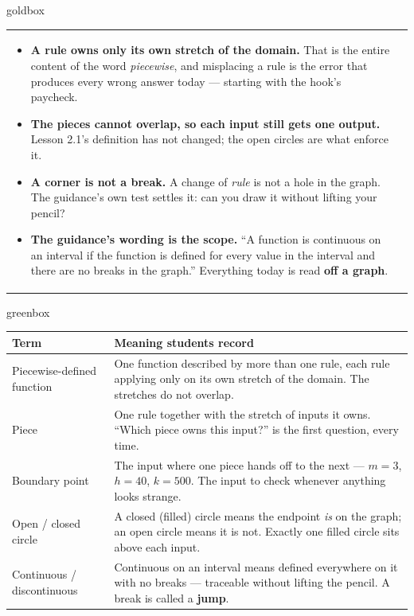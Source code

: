 \documentclass[10pt]{article}
\begin{document}
\begin{skillbox}{goldbox}
\begin{tabularx}{\linewidth}{@{}X|X@{}}
\begin{minipage}[t]{\linewidth}
\begin{itemize}[leftmargin=1.1em, itemsep=2pt, topsep=2pt]
  \item \textbf{A rule owns only its own stretch of the domain.} That is the entire content of the
        word \emph{piecewise}, and misplacing a rule is the error that produces every wrong answer
        today --- starting with the hook's paycheck.
  \item \textbf{The pieces cannot overlap, so each input still gets one output.} Lesson 2.1's
        definition has not changed; the open circles are what enforce it.
  \item \textbf{A corner is not a break.} A change of \emph{rule} is not a hole in the graph. The
        guidance's own test settles it: can you draw it without lifting your pencil?
  \item \textbf{The guidance's wording is the scope.} ``A function is continuous on an interval if
        the function is defined for every value in the interval and there are no breaks in the
        graph.'' Everything today is read \textbf{off a graph}.
\end{itemize}
\end{minipage}
\end{tabularx}
\end{skillbox}

\begin{skillbox}{greenbox}
\renewcommand{\arraystretch}{1.35}
\begin{tabularx}{\linewidth}{@{}p{4.1cm}X@{}}
\textbf{Term} & \textbf{Meaning students record} \\
\hline
Piecewise-defined function & One function described by more than one rule, each rule applying only on
    its own stretch of the domain. The stretches do not overlap. \\
Piece & One rule together with the stretch of inputs it owns. ``Which piece owns this input?'' is the
    first question, every time. \\
Boundary point & The input where one piece hands off to the next --- $m=3$, $h=40$, $k=500$. The
    input to check whenever anything looks strange. \\
Open / closed circle & A closed (filled) circle means the endpoint \emph{is} on the graph; an open
    circle means it is not. Exactly one filled circle sits above each input. \\
Continuous / discontinuous & Continuous on an interval means defined everywhere on it with no breaks
    --- traceable without lifting the pencil. A break is called a \textbf{jump}. \\
\end{tabularx}
\end{skillbox}
\end{document}
